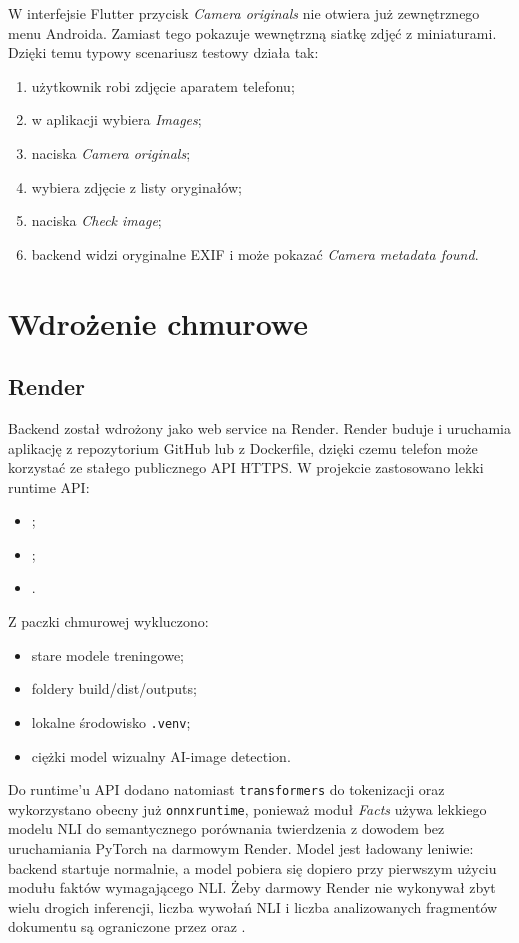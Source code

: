 \documentclass[12pt,a4paper]{article}
\begin{document}
W interfejsie Flutter przycisk \textit{Camera originals} nie otwiera już zewnętrznego menu Androida.
Zamiast tego pokazuje wewnętrzną siatkę zdjęć z miniaturami.
Dzięki temu typowy scenariusz testowy działa tak:
\begin{enumerate}
  \item użytkownik robi zdjęcie aparatem telefonu;
  \item w aplikacji wybiera \textit{Images};
  \item naciska \textit{Camera originals};
  \item wybiera zdjęcie z listy oryginałów;
  \item naciska \textit{Check image};
  \item backend widzi oryginalne EXIF i może pokazać \textit{Camera metadata found}.
\end{enumerate}

\section{Wdrożenie chmurowe}
\subsection{Render}
Backend został wdrożony jako web service na Render.
Render buduje i uruchamia aplikację z repozytorium GitHub lub z Dockerfile, dzięki czemu telefon może korzystać ze stałego publicznego API HTTPS.
W projekcie zastosowano lekki runtime API:
\begin{itemize}
  \item {};
  \item {};
  \item {}.
\end{itemize}

Z paczki chmurowej wykluczono:
\begin{itemize}
  \item stare modele treningowe;
  \item foldery build/dist/outputs;
  \item lokalne środowisko \texttt{.venv};
  \item ciężki model wizualny AI-image detection.
\end{itemize}
Do runtime'u API dodano natomiast \texttt{transformers} do tokenizacji oraz wykorzystano obecny już \texttt{onnxruntime}, ponieważ moduł \textit{Facts} używa lekkiego modelu NLI do semantycznego porównania twierdzenia z dowodem bez uruchamiania PyTorch na darmowym Render.
Model jest ładowany leniwie: backend startuje normalnie, a model pobiera się dopiero przy pierwszym użyciu modułu faktów wymagającego NLI.
Żeby darmowy Render nie wykonywał zbyt wielu drogich inferencji, liczba wywołań NLI i liczba analizowanych fragmentów dokumentu są ograniczone przez  oraz .
\end{document}
